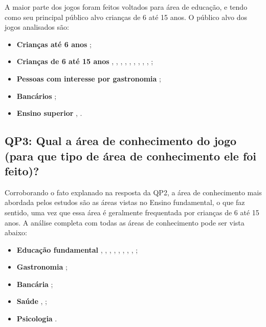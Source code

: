 \documentclass[12pt]{article}
\begin{document}
A maior parte dos jogos foram feitos voltados para área de educação, e tendo como seu principal público alvo crianças de 6 até 15 anos. O público alvo dos jogos analisados são:

\begin{itemize}
    \item \textbf{Crianças até 6 anos} \cite{baron2014approach};
    \item \textbf{Crianças de 6 até 15 anos} \cite{rowe2017assessing}, \cite{del2010easing}, \cite{asbell2013assessment}, \cite{harpstead2013search}, \cite{conrad2014framework}, \cite{mota2017environment}, \cite{falakmasir2016data}, \cite{min2019deepstealth}, \cite{kam2007localized}, \cite{kam2009improving};
    \item \textbf{Pessoas com interesse por gastronomia} \cite{moreno2007game};
    \item \textbf{Bancários} \cite{thomas2012evaluate};
    \item \textbf{Ensino superior} \cite{de20163d}, \cite{georgiadis2019bolstering}.
\end{itemize}

\subsection{QP3: Qual a área de conhecimento do jogo (para que tipo de área de conhecimento ele foi feito)?}

Corroborando o fato explanado na resposta da QP2, a área de conhecimento mais abordada pelos estudos são as áreas vistas no Ensino fundamental, o que faz sentido, uma vez que essa área é geralmente frequentada por crianças de 6 até 15 anos. A análise completa com todas as áreas de conhecimento pode ser vista abaixo:

\begin{itemize}
    \item \textbf{Educação fundamental} \cite{del2010easing}, \cite{rowe2017assessing}, \cite{asbell2013assessment}, \cite{harpstead2013search}, \cite{mota2017environment}, \cite{falakmasir2016data}, \cite{kam2007localized}, \cite{kam2009improving}, \cite{conrad2014framework};
    \item \textbf{Gastronomia} \cite{moreno2007game};
    \item \textbf{Bancária} \cite{thomas2012evaluate};
    \item \textbf{Saúde} \cite{de20163d}, \cite{georgiadis2019bolstering};
    \item \textbf{Psicologia} \cite{georgiadis2019reinforcing}.
\end{itemize}
\end{document}
